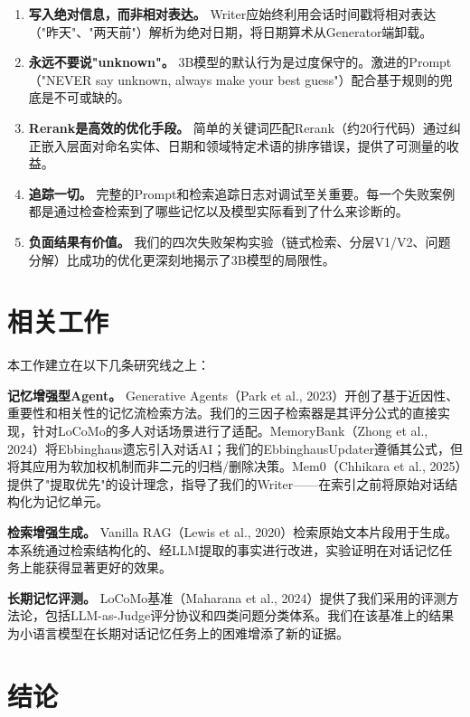 \documentclass[11pt,a4paper]{ctexart}
\begin{document}
\begin{enumerate}[nosep]
    \item \textbf{写入绝对信息，而非相对表达。} Writer应始终利用会话时间戳将相对表达（"昨天"、"两天前"）解析为绝对日期，将日期算术从Generator端卸载。
    \item \textbf{永远不要说"unknown"。} 3B模型的默认行为是过度保守的。激进的Prompt（"NEVER say unknown, always make your best guess"）配合基于规则的兜底是不可或缺的。
    \item \textbf{Rerank是高效的优化手段。} 简单的关键词匹配Rerank（约20行代码）通过纠正嵌入层面对命名实体、日期和领域特定术语的排序错误，提供了可测量的收益。
    \item \textbf{追踪一切。} 完整的Prompt和检索追踪日志对调试至关重要。每一个失败案例都是通过检查检索到了哪些记忆以及模型实际看到了什么来诊断的。
    \item \textbf{负面结果有价值。} 我们的四次失败架构实验（链式检索、分层V1/V2、问题分解）比成功的优化更深刻地揭示了3B模型的局限性。
\end{enumerate}

\section{相关工作}

本工作建立在以下几条研究线之上：

\textbf{记忆增强型Agent。} Generative Agents（Park et al., 2023）开创了基于近因性、重要性和相关性的记忆流检索方法。我们的三因子检索器是其评分公式的直接实现，针对LoCoMo的多人对话场景进行了适配。MemoryBank（Zhong et al., 2024）将Ebbinghaus遗忘引入对话AI；我们的EbbinghausUpdater遵循其公式，但将其应用为软加权机制而非二元的归档/删除决策。Mem0（Chhikara et al., 2025）提供了"提取优先"的设计理念，指导了我们的Writer——在索引之前将原始对话结构化为记忆单元。

\textbf{检索增强生成。} Vanilla RAG（Lewis et al., 2020）检索原始文本片段用于生成。本系统通过检索结构化的、经LLM提取的事实进行改进，实验证明在对话记忆任务上能获得显著更好的效果。

\textbf{长期记忆评测。} LoCoMo基准（Maharana et al., 2024）提供了我们采用的评测方法论，包括LLM-as-Judge评分协议和四类问题分类体系。我们在该基准上的结果为小语言模型在长期对话记忆任务上的困难增添了新的证据。

\section{结论}
\end{document}
